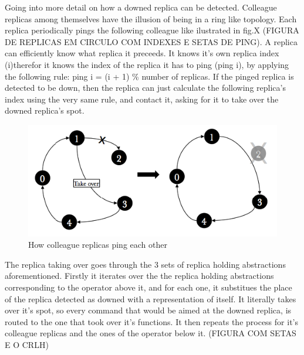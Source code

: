 \documentclass[times, 10pt,twocolumn]{article}
\begin{document}

Going into more detail on how a downed replica can be detected.
Colleague replicas among themselves have the illusion of being in a ring like topology. Each replica periodically pings the following colleague like ilustrated in fig.X (FIGURA DE REPLICAS EM CIRCULO COM INDEXES E SETAS DE PING). A replica can efficiently know what replica it preceeds. It knows it's own replica index (i)therefor it knows the index of the replica it has to ping (ping i), by applying the following rule: ping i = (i + 1) \% number of replicas.
If the pinged replica is detected to be down, then the replica can just calculate the following replica's index using the very same rule, and contact it, asking for it to take over the downed replica's spot.
\begin{figure}[h] 
	\includegraphics[width=\columnwidth]{fault_detection}
	\caption{How colleague replicas ping each other}
\end{figure}


The replica taking over goes through the 3 sets of replica holding abstractions aforementioned.
Firstly it iterates over the the replica holding abstractions corresponding to the operator above it, and for each one, it substitues the place of the replica detected as downed with a representation of itself. It literally takes over it's spot, so every command that would be aimed at the downed replica, is routed to the one that took over it's functions.
It then repeats the process for it's colleague replicas and the ones of the operator below it. (FIGURA COM SETAS E O CRLH)
\end{document}
